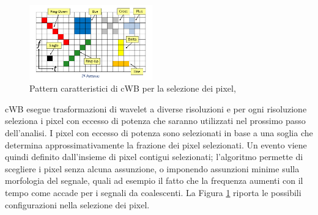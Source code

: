 \begin{figure}
	\vspace{-10pt}
	\begin{center}
		\includegraphics[width=0.475\textwidth]{figures/Capitolo_2/wavepacket_patterns.png}
	\end{center}
	\vspace{-5pt}
	\caption{Pattern caratteristici di cWB per la selezione dei pixel, \cite{cWB_Manual}}
	\label{fig:patterns}
	\vspace{-15pt}
\end{figure}
cWB esegue trasformazioni di wavelet a diverse risoluzioni e per ogni risoluzione seleziona i pixel con eccesso di potenza che saranno utilizzati nel prossimo passo dell'analisi. I pixel con eccesso di potenza sono selezionati in base a una soglia che determina approssimativamente la frazione dei pixel selezionati. Un evento viene quindi definito dall'insieme di pixel contigui selezionati; l'algoritmo permette di scegliere i pixel senza alcuna assunzione, o imponendo assunzioni minime sulla morfologia del segnale, quali ad esempio il fatto che la frequenza aumenti con il tempo come accade per i segnali da coalescenti. La Figura \ref{fig:patterns} riporta le possibili configurazioni nella selezione dei pixel.


